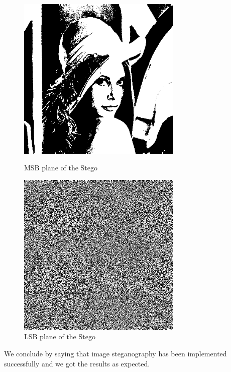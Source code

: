 \documentclass{report}
\begin{document}
\begin{figure}[H]
\centering
\begin{minipage}{0.46\linewidth}
\centering
\includegraphics[width=0.7\textwidth]{images/stegomsb.png}
\caption{MSB plane of the Stego}
\end{minipage}
\hfill
\begin{minipage}{0.46\linewidth}
\centering
\includegraphics[width=0.7\textwidth]{images/stegolsb.png}
\caption{LSB plane of the Stego}
\end{minipage}
\end{figure}
We conclude by saying that image steganography has been implemented successfully and we got the results as expected.

\begin{center}
\decosix\decosix\decosix
\end{center}
\end{document}

